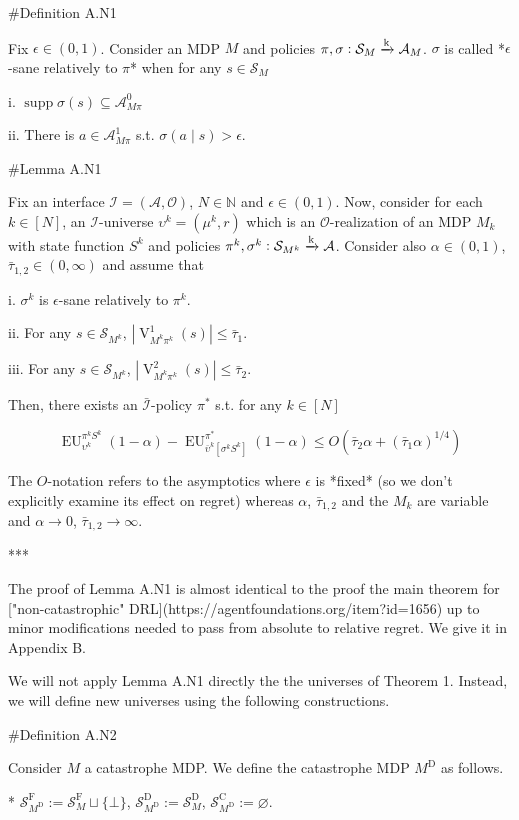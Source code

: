 \documentclass[a4paper]{article}
\DeclareMathOperator{\Supp}{supp}
\newcommand{\AP}[1]{\left(#1\right)}
\newcommand{\AB}[1]{\left[#1\right]}
\newcommand{\Nats}{\mathbb{N}}
\newcommand{\Abs}[1]{\left\vert #1 \right\vert}
\newcommand{\M}{\xrightarrow{\textnormal{k}}}
\newcommand{\Ob}{\mathcal{O}}
\newcommand{\A}{\mathcal{A}}
\newcommand{\St}{\mathcal{S}}
\newcommand{\In}{\mathcal{I}}
\newcommand{\Adi}{{\bar{\In}}}
\newcommand{\RMC}{\mathrm{C}}
\newcommand{\RMD}{\mathrm{D}}
\newcommand{\RMF}{\mathrm{F}}
\newcommand{\SF}{\St^{\RMF}}
\newcommand{\SD}{\St^{\RMD}}
\newcommand{\SC}{\St^{\RMC}}
\newcommand{\MD}{M^{\RMD}}
\newcommand{\V}{\operatorname{V}}
\newcommand{\EU}{\operatorname{EU}}
\begin{document}
\#Definition A.N1

Fix $\epsilon\in(0,1)$. Consider an MDP $M$ and policies $\pi,\sigma: \St_M \M \A_M$. $\sigma$ is called *$\epsilon$-sane relatively to $\pi$* when for any $s \in \St_M$

i. $\Supp{\sigma(s)} \subseteq \A_{M\pi}^0$

ii. There is $a \in \A_{M\pi}^1$ s.t. $\sigma(a \mid s) > \epsilon$.

\#Lemma A.N1

Fix an interface $\In=(\A,\Ob)$, $N \in \Nats$ and $\epsilon \in (0,1)$. Now, consider for each $k \in [N]$, an $\In$-universe $\upsilon^k=(\mu^k,r)$ which is an $\Ob$-realization of an MDP $M_k$ with state function $S^k$ and policies $\pi^k,\sigma^k: \St_{M^k} \M \A$. Consider also $\alpha\in(0,1)$, $\bar{\tau}_{1,2} \in (0,\infty)$ and assume that 

i. $\sigma^k$ is $\epsilon$-sane relatively to $\pi^k$.

ii. For any $s \in \St_{M^k}$, $\Abs{\V^1_{M^k\pi^k}(s)} \leq \bar{\tau}_1$.

iii. For any $s \in \St_{M^k}$, $\Abs{\V^2_{M^k\pi^k}(s)} \leq \bar{\tau}_2$.

Then, there exists an $\Adi$-policy $\pi^*$ s.t. for any $k \in [N]$

$$\EU_{\upsilon^k}^{\pi^k S^k}(1-\alpha) - \EU_{\bar{\upsilon}^k\AB{\sigma^k S^k}}^{\pi^*}(1-\alpha) \leq O\AP{\bar{\tau}_2 \alpha + (\bar{\tau}_1 \alpha)^{1/4}}$$

The $O$-notation refers to the asymptotics where $\epsilon$ is *fixed* (so we don't explicitly examine its effect on regret) whereas $\alpha$, $\bar{\tau}_{1,2}$ and the $M_k$ are variable and $\alpha \rightarrow 0$, $\bar{\tau}_{1,2} \rightarrow \infty$.

***

The proof of Lemma A.N1 is almost identical to the proof the main theorem for ["non-catastrophic" DRL](https://agentfoundations.org/item?id=1656) up to minor modifications needed to pass from absolute to relative regret. We give it in Appendix B.

We will not apply Lemma A.N1 directly the the universes of Theorem 1. Instead, we will define new universes using the following constructions.

\#Definition A.N2

Consider $M$ a catastrophe MDP. We define the catastrophe MDP $\MD$ as follows.

* $\SF_{\MD}:=\SF_M \sqcup \{\bot\}$, $\SD_{\MD}:=\SD_M$, $\SC_{\MD}:=\varnothing$.
\end{document}
